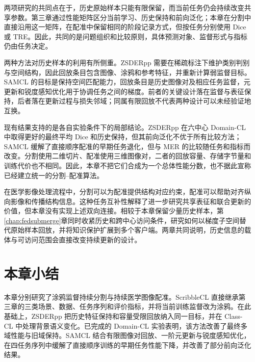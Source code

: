 两项研究的共同点在于，历史原始样本只能有限保留，而当前任务仍会持续改变共享参数。第三章通过性能矩阵区分当前学习、历史保持和前向泛化；本章在分割中直接沿用这一矩阵，在配准中保留相同的阶段记录方式，但按任务分别使用 Dice 或 TRE。因此，共同的是问题组织和比较原则，具体预测对象、监督形式与指标仍由任务决定。

两种方法对历史样本的利用有所侧重。ZSDERpp 需要在稀疏标注下维护类别判别与空间结构，因此回放条目包含图像、涂鸦和参考特征，并重新计算弱监督目标。SAMCL 的目标是保持空间匹配能力，回放条目是历史图像对及相应任务监督，元更新和锐度感知优化用于协调任务之间的梯度。前者的关键设计落在监督与表征保持，后者落在更新过程与损失邻域；同属有限回放不代表两种设计可以未经验证地互换。

现有结果支持的是各自实验条件下的局部结论。ZSDERpp 在六中心 Domain-CL 中取得更好的最终平均 Dice 和历史保持，但其前向泛化不优于所有比较方法；SAMCL 缓解了直接顺序配准的早期任务退化，但与 MER 的比较随任务和指标而改变。分割使用二维切片、配准使用三维图像对，二者的回放容量、存储字节量和训练代价也不相同。因此，本章不把它们合成为一个总体性能分数，也不据此宣称已经建立统一的分割--配准算法。

在医学影像处理流程中，分割可以为配准提供结构对应约束，配准可以帮助对齐纵向影像和传播结构信息。这种任务互补性解释了进一步研究共享表征和联合更新的价值，但本章没有实现上述双向连接。相较于本章保留少量历史样本，第\ref{chap:fedsubmerge}章同时收紧历史和跨中心访问条件，研究如何以梯度子空间替代原始样本回放，并将知识保护扩展到多个客户端。两章共同说明，历史信息的载体与可访问范围会直接改变持续更新的设计。

\section{本章小结}
\label{sec:task-cl-summary}

本章分别研究了涂鸦监督持续分割与持续医学图像配准。ScribbleCL 直接继承第三章的三类场景、数据、任务序列和评价指标，并将当前训练监督改为涂鸦。在此基础上，ZSDERpp 把历史特征保持和容量受限回放纳入同一目标，并在 Class-CL 中处理背景语义变化。已完成的 Domain-CL 实验表明，该方法改善了最终多域性能与旧域保持。SAMCL 结合有限图像对回放、一阶元更新与锐度感知优化，在四任务序列中缓解了直接顺序训练的早期任务性能下降，并改善了部分前向泛化结果。
